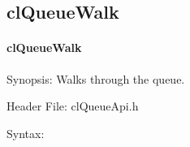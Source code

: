 \begin{flushleft}
\subsection{clQueueWalk}
\hypertarget{pageq104}{}\paragraph{cl\-Queue\-Walk}\label{pageq104}
\begin{Desc}
\item[Synopsis:]Walks through the queue.\end{Desc}
\begin{Desc}
\item[Header File:]clQueueApi.h\end{Desc}
\begin{Desc}
\item[Syntax:]


\end{Desc}
\end{flushleft}
